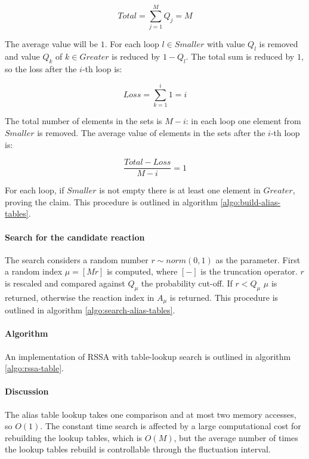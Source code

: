      $$Total = \sum\limits_{j=1}^MQ_j = M$$

      The average value will be $1$.
      For each loop $l\in Smaller$ with value $Q_l$ is removed and value $Q_k$ of $k\in Greater $ is reduced by $1-Q_l$.
      The total sum is reduced by $1$, so the loss after the $i$-th loop is:

      $$Loss = \sum\limits_{k=1}^i 1 = i$$

      The total number of elements in the sets is $M-i$: in each loop one element from $Smaller$ is removed.
      The average value of elements in the sets after the $i$-th loop is:

      $$\frac{Total-Loss}{M-i} = 1$$

      For each loop, if $Smaller$ is not empty there is at least one element in $Greater$, proving the claim.
      This procedure is outlined in algorithm \ref{algo:build-alias-tables}.

      

      \paragraph{Search for the candidate reaction}
      The search considers a random number $r\sim norm(0,1)$ as the parameter.
      First a random index $\mu = [Mr]$ is computed, where $[-]$ is the truncation operator.
      $r$ is rescaled and compared against $Q_\mu$ the probability cut-off.
      If $r< Q_\mu$ $\mu$ is returned, otherwise the reaction index in $A_\mu$ is returned.
      This procedure is outlined in algorithm \ref{algo:search-alias-tables}.

      

      \paragraph{Algorithm}
      An implementation of RSSA with table-lookup search is outlined in algorithm \ref{algo:rssa-table}.

      

      \paragraph{Discussion}
      The alias table lookup takes one comparison and at most two memory accesses, so $O(1)$.
      The constant time search is affected by a large computational cost for rebuilding the lookup tables, which is $O(M)$, but the average number of times the lookup tables rebuild is controllable through the fluctuation interval.
